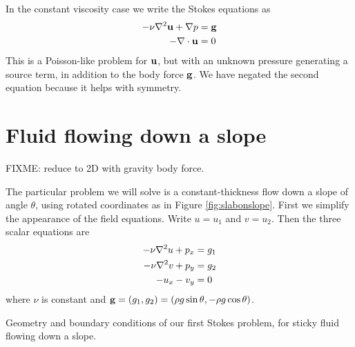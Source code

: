 In the constant viscosity case we write the Stokes equations as
\begin{align}
- \nu \nabla^2 \mathbf{u} + \nabla p &= \mathbf{g} \\
- \nabla\cdot \mathbf{u} &= 0
\end{align}
This is a Poisson-like problem for $\mathbf{u}$, but with an unknown pressure generating a source term, in addition to the body force $\mathbf{g}$.  We have negated the second equation because it helps with symmetry.

\section{Fluid flowing down a slope}

FIXME: reduce to 2D with gravity body force.

The particular problem we will solve is a constant-thickness flow down a slope of angle $\theta$, using rotated coordinates as in Figure \ref{fig:slabonslope}.  First we simplify the appearance of the field equations.  Write $u=u_1$ and $v=u_2$.  Then the three scalar equations are
\begin{align}
-\nu \nabla^2 u + p_x &= g_1 \label{stokes2du} \\
-\nu \nabla^2 v + p_y &= g_2 \label{stokes2dv} \\
- u_x - v_y &= 0 \label{stokes2dincomp}
\end{align}
where $\nu$ is constant and $\mathbf{g} = (g_1,g_2) = (\rho g \sin \theta, - \rho g \cos \theta)$.

\begin{marginfigure}

\caption{Geometry and boundary conditions of our first Stokes problem, for sticky fluid flowing down a slope.}
\label{fig:slabonslope}
\end{marginfigure}


